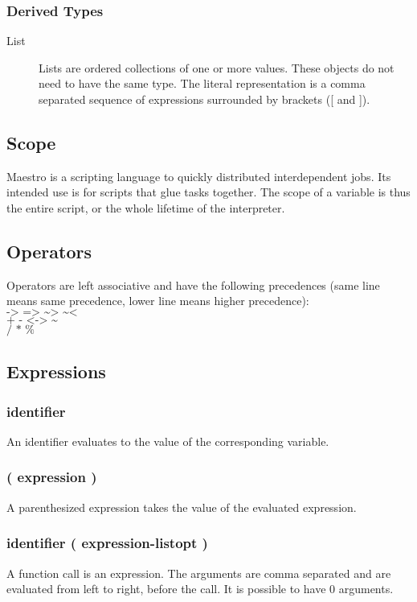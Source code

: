 \documentclass[12pt]{article}
\begin{document}
\subsubsection{Derived Types}
\begin{description}
  \item[List] Lists are ordered collections of one or more values. These
    objects do not need to have the same type. The literal representation is a
    comma separated sequence of expressions surrounded by brackets ([ and ]).
\end{description}

\subsection{Scope}
Maestro is a scripting language to quickly distributed interdependent jobs. Its
intended use is for scripts that glue tasks together. The scope of a variable
is thus the entire script, or the whole lifetime of the interpreter.

\subsection{Operators}
Operators are left associative and have the following precedences (same line
means same precedence, lower line means higher precedence):\\
$\texttt{-> => \textasciitilde> \textasciitilde<}$\\
$\texttt{+ - <-> \textasciitilde}$\\
$\texttt{/ * \%}$

\subsection{Expressions}
\subsubsection{identifier}
An identifier evaluates to the value of the corresponding variable.

\subsubsection{( expression )}
A parenthesized expression takes the value of the evaluated expression.

\subsubsection{identifier ( expression-listopt )}
A function call is an expression. The arguments are comma separated and are evaluated
from left to right, before the call. It is possible to have 0 arguments.
\end{document}
